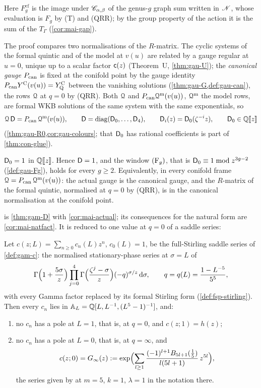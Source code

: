 Here $F_g^{\mathrm{cf}}$ is the image under $\mathscr{C}_{\alpha,\beta}$ of the genus-$g$ graph sum written in $\mathscr{N}$, whose evaluation is $F_g$ by (T) and (QRR); by the group property of the action \cite[Def.~2.13, Prop.~2.14]{PPZ15} it is the sum of the $T_\Gamma$ (\cref{cor:mai-gap}).

The proof compares two normalisations of the $R$-matrix. The cyclic systems of the formal quintic and of the model at $v(u)$ are related by a gauge regular at $u=0$, unique up to a scalar factor $\mathsf{c}(z)$ (Theorem~U, \cref{thm:gau-U}); the \emph{canonical gauge} $P_{\mathrm{can}}$ is fixed at the conifold point by the gauge identity $P_{\mathrm{can}}Y^{\mathrm{C}}(v(u))=Y^{\mathrm{C}}_{\mathrm{Q}}$ between the vanishing solutions (\cref{thm:gau-G,def:gau-can}), the rows $\mathcal{Q}$ at $q=0$ by (QRR). Both $\mathcal{Q}$ and $P_{\mathrm{can}}\mathcal{Q}^{\mathrm m}(v(u))$, $\mathcal{Q}^{\mathrm m}$ the model rows, are formal WKB solutions of the same system with the same exponentials, so
\[
\mathcal{Q}\,\mathsf{D}=P_{\mathrm{can}}\,\mathcal{Q}^{\mathrm m}(v(u)),\qquad \mathsf{D}=\operatorname{diag}(\mathsf{D}_0,\dots,\mathsf{D}_4),\qquad \mathsf{D}_i(z)=\mathsf{D}_0(\zeta^{-i}z),\qquad \mathsf{D}_0\in\mathbb{Q}[\![ z ]\!]
\]
(\cref{thm:gau-R0,cor:gau-colours}; that $\mathsf{D}_0$ has rational coefficients is part of \cref{thm:con-glue}).

\begin{thm}
\label{thm:int-D}
$\mathsf{D}_0=1$ in $\mathbb{Q}[\![ z ]\!]$. Hence $\mathsf{D}=1$, and the window $(\mathrm{F}_{g})$, that is $\mathsf{D}_0\equiv1\bmod z^{3g-2}$ (\cref{def:gau-Fg}), holds for every $g\geq2$. Equivalently, in every conifold frame $\mathcal{Q}=P_{\mathrm{can}}\,\mathcal{Q}^{\mathrm m}(v(u))$: the actual gauge is the canonical gauge, and the $R$-matrix of the formal quintic, normalised at $q=0$ by (QRR), is in the canonical normalisation at the conifold point.
\end{thm}

 is \cref{thm:gam-D} with \cref{cor:mai-actual}; its consequences for the natural form are \cref{cor:mai-natfact}. It is reduced to one value at $q=0$ of a saddle series:

\begin{thm}
\label{thm:int-gamma}
Let $c(z;L)=\sum_{n\geq0}c_n(L)z^n$, $c_0(L)=1$, be the full-Stirling saddle series of \cref{def:gam-c}: the normalised stationary-phase series at $\sigma=L$ of
\[
\Gamma\Bigl(1+\frac{5\sigma}{z}\Bigr)\prod_{j=0}^{4}\Gamma\Bigl(\frac{\zeta^j-\sigma}{z}\Bigr)(-q)^{\sigma/z}\,\mathrm{d}\sigma,\qquad q=q(L)=\frac{1-L^{-5}}{5^5},
\]
with every Gamma factor replaced by its formal Stirling form (\cref{def:fsp-stirling}). Then every $c_n$ lies in $\mathbb{A}_{L}=\mathbb{Q}[L,L^{-1},(L^5-1)^{-1}]$, and:
\begin{enumerate}
\item[(a)] no $c_n$ has a pole at $L=1$, that is, at $q=0$, and $c(z;1)=h(z)$;
\item[(b)] no $c_n$ has a pole at $L=0$, that is, at $q=\infty$, and
\[
c(z;0)=G_{\infty}(z):=\exp\Bigl(\sum_{l\geq1}\frac{(-1)^{l+1}B_{5l+1}(\frac15)}{l(5l+1)}\,z^{5l}\Bigr),
\]
the series given by \cite[Lemma~7.7, (37)]{GJR18} at $m=5$, $k=1$, $\lambda=1$ in the notation there.
\end{enumerate}
\end{thm}

